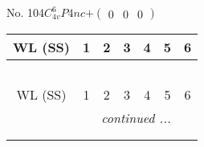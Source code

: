 \documentclass[fleqn,9pt,landscape]{jsarticle}
\begin{document}
\newpage
No. 104\quad$C_{4v}^{6}$\quad$P4nc$\quad[ tetragonal ]\quad$+\begin{pmatrix} 0 & 0 & 0 \end{pmatrix}$
\begin{center}
\renewcommand{\arraystretch}{1.2}
\begin{longtable}{ccccccc}
 \hline \hline
WL (SS) & 1 & 2 & 3 & 4 & 5 & 6 \\ \hline \endfirsthead

\multicolumn{6}{l}{\tablename\ \thetable{}} \\
 \hline \hline
WL (SS) & 1 & 2 & 3 & 4 & 5 & 6 \\ \hline \endhead

 \hline \hline
\multicolumn{6}{r}{\footnotesize\it continued ...} \\ \endfoot

 \hline \hline
\multicolumn{6}{r}{} \\ \endlastfoot


\end{longtable}
\end{center}
\end{document}
